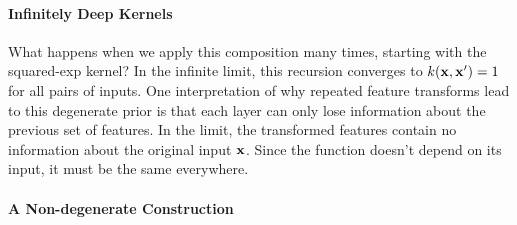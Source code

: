 \documentclass[twoside]{article}
\begin{document}
\paragraph{Infinitely Deep Kernels}
What happens when we apply this composition many times, starting with the squared-exp kernel?  In the infinite limit, this recursion converges to $k({\bf{x}},{\bf{x}}') = 1$ for all pairs of inputs.  
%
One interpretation of why repeated feature transforms lead to this degenerate prior is that each layer can only lose information about the previous set of features.  
In the limit, the transformed features contain no information about the original input ${\bf{x}}$.  Since the function doesn't depend on its input, it must be the same everywhere.

\paragraph{A Non-degenerate Construction}
\end{document}
